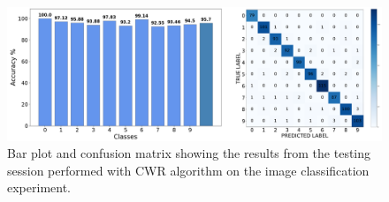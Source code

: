 \documentclass[12pt]{report}
\begin{document}
\begin{figure}[h!]
    \centering
    \includegraphics[width=140mm]{Figures/Chapter5/OPENMV_CWR.png} 
    \caption{Bar plot and confusion matrix showing the results from the testing session performed with CWR algorithm on the image classification experiment.}
    \label{fig:openmv_res_CWR}    
\end{figure}
\end{document}
